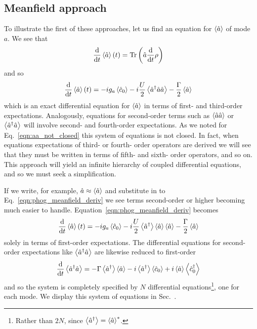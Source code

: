 \subsection{Meanfield approach}\label{sec:meanfield}
To illustrate the first of these approaches, let us find an equation for $\ev{\hat{a}}$ of mode $a$. We see that
\begin{equation}
\ddt \ev{\hat{a}}\left(t\right) = \text{Tr}\left( \hat{a} \ddt \rho\right)
\end{equation}
and so
\begin{equation}\label{eqn:phog_meanfield_deriv}
\ddt \ev{\hat{a}}\left(t\right) = - i g_a \ev{\hat{c}_0} - i \frac{U}{2} \ev{\hat{a}^\dagger \hat{a}\hat{a}} - \frac{\Gamma}{2} \ev{\hat{a}}
\end{equation}
which is an exact differential equation for $\ev{\hat{a}}$ in terms of first- and third-order expectations. Analogously, equations for second-order terms such as $\ev{\hat{a}\hat{a}}$ or $\ev{\hat{a}^\dagger \hat{a}}$ will involve second- and fourth-order expectations. As we noted for Eq.~\ref{eqn:aa_not_closed} this system of equations is not closed. In fact, when equations expectations of third- or fourth- order operators are derived we will see that they must be written in terms of fifth- and sixth- order operators, and so on. This approach will yield an infinite hierarchy of coupled differential equations, and so we must seek a simplification.

If we write, for example, $\hat{a} \approx \ev{\hat{a}}$ and substitute in to Eq.~\ref{eqn:phog_meanfield_deriv} we see terms second-order or higher becoming much easier to handle. Equation~\ref{eqn:phog_meanfield_deriv} becomes
\begin{equation}\label{eqn:phog_meanfield_deriv_1}
\ddt \ev{\hat{a}}\left(t\right) = - i g_a \ev{\hat{c}_0} - i \frac{U}{2} \ev{\hat{a}^\dagger} \ev{\hat{a}} \ev{\hat{a}} - \frac{\Gamma}{2} \ev{\hat{a}}
\end{equation}
solely in terms of first-order expectations. The differential equations for second-order expectations like $\ev{\hat{a}^\dagger \hat{a}}$ are likewise reduced to first-order
\begin{equation}
\ddt \ev{\hat{a}^\dagger \hat{a}} = - \Gamma \ev{\hat{a}^\dagger}\ev{\hat{a}} - i \ev{\hat{a}^\dagger}\ev{\hat{c}_0} + i \ev{\hat{a}}\ev{\hat{c}_0^\dagger}
\end{equation}
and so the system is completely specified by $N$ differential equations\footnote{Rather than $2N$, since $\ev{\hat{a}^\dagger} = \ev{\hat{a}}^*$.}, one for each mode. We display this system of equations in Sec.~. %


